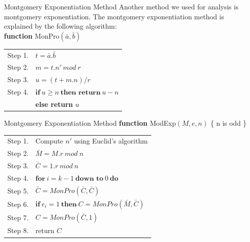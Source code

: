\documentclass[xcolor=dvipsnames]{beamer}
\begin{document}
\begin{frame}{Montgomery Exponentiation Method}
Another method we used for analysis is montgomery exponentiation. The montgomery exponentiation method is explained by the following algorithm:\\
\medskip
\textbf{function} MonPro$(\bar a,\bar b)$\\
\begin{tabular}{rl}
Step 1. &$t = \bar a. \bar b$\\
Step 2. &$m=t.n' \ mod \ r$\\
Step 3. & $u = (t + m.n ) / r$\\
Step 4.  & $\textbf{if} \  u\geq n \ \textbf{then return} \ u-n$ \\
& \hspace{13mm} \textbf{else return} $ u $\\
\end{tabular}
\end{frame}


\begin{frame}{Montgomery Exponentiation Method}
\textbf{function} ModExp$(M,e,n)$ \{ n is odd \}\\
\begin{tabular}{rl}
Step 1. & Compute $n'$ using Euclid's algorithm\\
Step 2. & $\bar M = M.r \ mod \ n$\\
Step 3. & $\bar C = 1.r \ mod \ n$\\
Step 4.  & $ \textbf{for} \  i=k-1 \  \textbf{down to}  \ 0 \ \textbf{do} $\\
Step 5. & \hspace{5mm} $\bar C = MonPro(\bar C, \bar C)$\\
Step 6. & \hspace{5mm} $\textbf{if} \ e_i=1 \ \textbf{then} \bar \ C = MonPro(\bar M, \bar C) $\\
Step 7. & $C = MonPro(\bar{C},1)$\\
Step 8. & return $C$\\
\end{tabular}
\end{frame}
\end{document}
